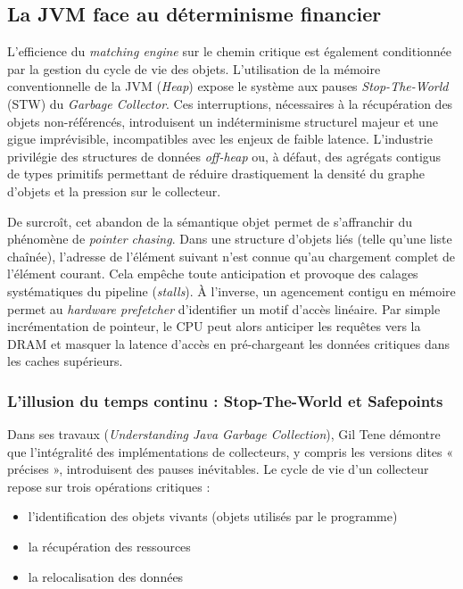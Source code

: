 \subsection{La JVM face au déterminisme financier}
L'efficience du \textit{matching engine} sur le chemin critique est également conditionnée par la gestion du cycle de vie des objets. L'utilisation de la mémoire conventionnelle de la JVM (\textit{Heap}) expose le système aux pauses \textit{Stop-The-World} (STW) du \textit{Garbage Collector}. Ces interruptions, nécessaires à la récupération des objets non-référencés, introduisent un indéterminisme structurel majeur et une gigue imprévisible, incompatibles avec les enjeux de faible latence. L'industrie privilégie des structures de données \textit{off-heap} ou, à défaut, des agrégats contigus de types primitifs permettant de réduire drastiquement la densité du graphe d'objets et la pression sur le collecteur.

De surcroît, cet abandon de la sémantique objet permet de s'affranchir du phénomène de \textit{pointer chasing}. Dans une structure d'objets liés (telle qu'une liste chaînée), l'adresse de l'élément suivant n'est connue qu'au chargement complet de l'élément courant. Cela empêche toute anticipation et provoque des calages systématiques du pipeline (\textit{stalls}). À l'inverse, un agencement contigu en mémoire permet au \textit{hardware prefetcher} d'identifier un motif d'accès linéaire. Par simple incrémentation de pointeur, le CPU peut alors anticiper les requêtes vers la DRAM et masquer la latence d'accès en pré-chargeant les données critiques dans les caches supérieurs.

\subsubsection{L'illusion du temps continu : Stop-The-World et Safepoints}
Dans ses travaux (\textit{Understanding Java Garbage Collection}), Gil Tene démontre que l'intégralité des implémentations de collecteurs, y compris les versions dites « précises », introduisent des pauses inévitables. Le cycle de vie d'un collecteur repose sur trois opérations critiques :

\begin{itemize}
    \item l'identification des objets vivants (objets utilisés par le programme)
    \item la récupération des ressources
    \item la relocalisation des données
\end{itemize}

